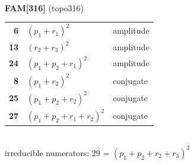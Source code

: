 \documentclass[10pt]{article}
\begin{document}
\begin{minipage}[t]{0.48\textwidth}
{}\\[2mm]\textbf{FAM[316]} (topo316)\\[2pt]{\footnotesize\begin{tabular}{@{}r@{\ \ }l@{\ \ }l@{}}\textbf{6} & $(p_1+r_1)^2$ & amplitude\\
\textbf{13} & $(r_2+r_3)^2$ & amplitude\\
\textbf{24} & $(p_1+p_2+r_1)^2$ & amplitude\\
\textbf{8} & $(p_1+r_2)^2$ & conjugate\\
\textbf{25} & $(p_1+p_2+r_2)^2$ & conjugate\\
\textbf{27} & $(p_1+p_2+r_1+r_2)^2$ & conjugate\\\end{tabular}}\\[2pt]{\scriptsize irreducible numerators: 29 = $(p_1+p_2+r_2+r_3)^2$}\end{minipage}

\bigskip
\end{document}

